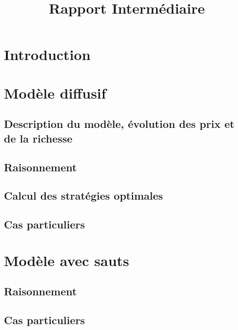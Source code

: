 \documentclass[11pt,letterpaper]{article}
\title{Rapport Intermédiaire}
\begin{document}



\pagebreak
\tableofcontents
\pagebreak

\section{Introduction}



\pagebreak
\section{Modèle diffusif}
%
\subsection{Description du modèle, évolution des prix et de la richesse}

\subsection{Raisonnement}

\subsection{Calcul des stratégies optimales}

\subsection{Cas particuliers}




\pagebreak
\section{Modèle avec sauts}
\subsection{Raisonnement}

\subsection{Cas particuliers}


\pagebreak
\nocite{*}


\end{document}
